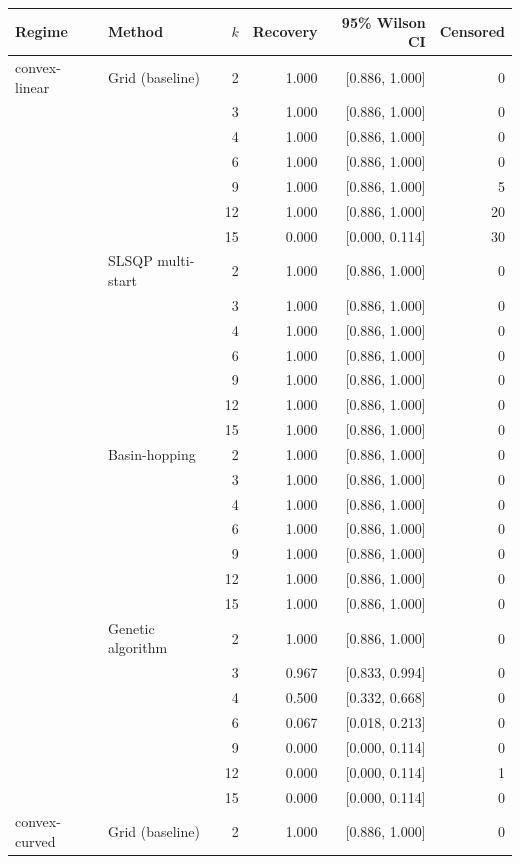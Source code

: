 \begin{tabular}{llrrrr}
\toprule
Regime & Method & $k$ & Recovery & 95\% Wilson CI & Censored \\
\midrule
convex-linear & Grid (baseline) & 2 & 1.000 & [0.886, 1.000] & 0 \\
 &  & 3 & 1.000 & [0.886, 1.000] & 0 \\
 &  & 4 & 1.000 & [0.886, 1.000] & 0 \\
 &  & 6 & 1.000 & [0.886, 1.000] & 0 \\
 &  & 9 & 1.000 & [0.886, 1.000] & 5 \\
 &  & 12 & 1.000 & [0.886, 1.000] & 20 \\
 &  & 15 & 0.000 & [0.000, 0.114] & 30 \\
\addlinespace
 & SLSQP multi-start & 2 & 1.000 & [0.886, 1.000] & 0 \\
 &  & 3 & 1.000 & [0.886, 1.000] & 0 \\
 &  & 4 & 1.000 & [0.886, 1.000] & 0 \\
 &  & 6 & 1.000 & [0.886, 1.000] & 0 \\
 &  & 9 & 1.000 & [0.886, 1.000] & 0 \\
 &  & 12 & 1.000 & [0.886, 1.000] & 0 \\
 &  & 15 & 1.000 & [0.886, 1.000] & 0 \\
\addlinespace
 & Basin-hopping & 2 & 1.000 & [0.886, 1.000] & 0 \\
 &  & 3 & 1.000 & [0.886, 1.000] & 0 \\
 &  & 4 & 1.000 & [0.886, 1.000] & 0 \\
 &  & 6 & 1.000 & [0.886, 1.000] & 0 \\
 &  & 9 & 1.000 & [0.886, 1.000] & 0 \\
 &  & 12 & 1.000 & [0.886, 1.000] & 0 \\
 &  & 15 & 1.000 & [0.886, 1.000] & 0 \\
\addlinespace
 & Genetic algorithm & 2 & 1.000 & [0.886, 1.000] & 0 \\
 &  & 3 & 0.967 & [0.833, 0.994] & 0 \\
 &  & 4 & 0.500 & [0.332, 0.668] & 0 \\
 &  & 6 & 0.067 & [0.018, 0.213] & 0 \\
 &  & 9 & 0.000 & [0.000, 0.114] & 0 \\
 &  & 12 & 0.000 & [0.000, 0.114] & 1 \\
 &  & 15 & 0.000 & [0.000, 0.114] & 0 \\
\addlinespace
\midrule
convex-curved & Grid (baseline) & 2 & 1.000 & [0.886, 1.000] & 0 \\

\end{tabular}

